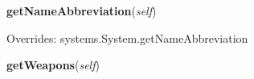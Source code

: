     \vspace{0.5ex}

\hspace{.8\funcindent}\begin{boxedminipage}{\funcwidth}

    \raggedright \textbf{getNameAbbreviation}(\textit{self})

\setlength{\parskip}{2ex}
\setlength{\parskip}{1ex}
      Overrides: systems.System.getNameAbbreviation

    \end{boxedminipage}

    \label{systems:WeaponControl:getWeapons}

    \vspace{0.5ex}

\hspace{.8\funcindent}\begin{boxedminipage}{\funcwidth}

    \raggedright \textbf{getWeapons}(\textit{self})

\setlength{\parskip}{2ex}
\setlength{\parskip}{1ex}
    \end{boxedminipage}

    \label{systems:WeaponControl:addWeapon}

    \vspace{0.5ex}

